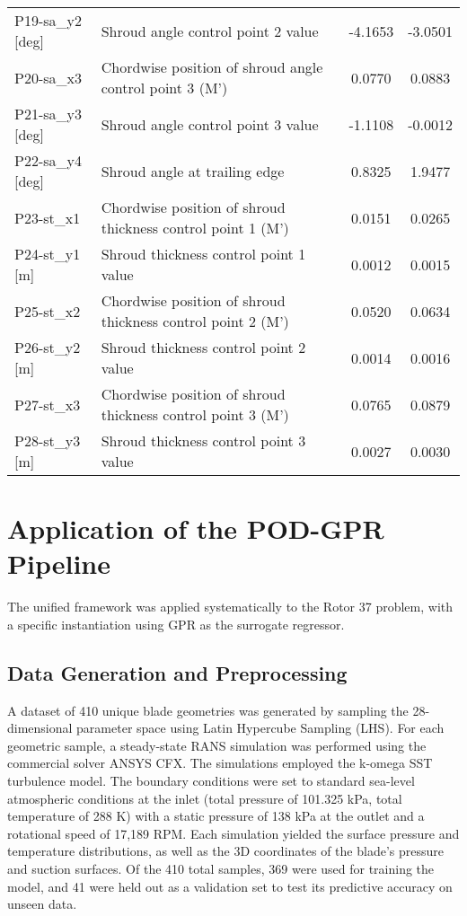 \documentclass[dscexam, EN]{ufabcFHZh}
\begin{document}
\begin{table}[htbp]
\begin{tabular}{|l|l|c|c|}
    P19-sa\_y2 [deg] & Shroud angle control point 2 value & -4.1653 & -3.0501 \\
    P20-sa\_x3 & Chordwise position of shroud angle control point 3 (M') & 0.0770 & 0.0883 \\
    P21-sa\_y3 [deg] & Shroud angle control point 3 value & -1.1108 & -0.0012 \\
    P22-sa\_y4 [deg] & Shroud angle at trailing edge & 0.8325 & 1.9477 \\
    P23-st\_x1 & Chordwise position of shroud thickness control point 1 (M') & 0.0151 & 0.0265 \\
    P24-st\_y1 [m] & Shroud thickness control point 1 value & 0.0012 & 0.0015 \\
    P25-st\_x2 & Chordwise position of shroud thickness control point 2 (M') & 0.0520 & 0.0634 \\
    P26-st\_y2 [m] & Shroud thickness control point 2 value & 0.0014 & 0.0016 \\
    P27-st\_x3 & Chordwise position of shroud thickness control point 3 (M') & 0.0765 & 0.0879 \\
    P28-st\_y3 [m] & Shroud thickness control point 3 value & 0.0027 & 0.0030 \\
    \hline
  \end{tabular}
\end{table}

\section{Application of the POD-GPR Pipeline}

The unified framework was applied systematically to the Rotor 37 problem, with a specific instantiation using GPR as the surrogate regressor.


\subsection{ Data Generation and Preprocessing}

A dataset of 410 unique blade geometries was generated by sampling the 28-dimensional parameter space using Latin Hypercube Sampling (LHS). For each geometric sample, a steady-state RANS simulation was performed using the commercial solver ANSYS CFX. The simulations employed the k-omega SST turbulence model. The boundary conditions were set to standard sea-level atmospheric conditions at the inlet (total pressure of 101.325 kPa, total temperature of 288 K) with a static pressure of 138 kPa at the outlet and a rotational speed of 17,189 RPM. Each simulation yielded the surface pressure and temperature distributions, as well as the 3D coordinates of the blade's pressure and suction surfaces. Of the 410 total samples, 369 were used for training the model, and 41 were held out as a validation set to test its predictive accuracy on unseen data. 
\end{document}
